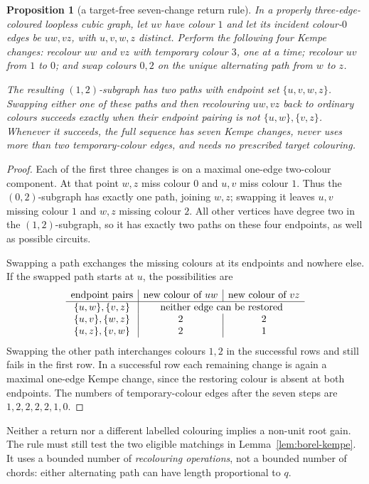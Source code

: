 \documentclass[11pt,a4paper]{article}
\newtheorem{proposition}[theorem]{Proposition}
\theoremstyle{definition}
\theoremstyle{remark}
\begin{document}
\begin{proposition}[a target-free seven-change return rule]\label{prop:two-buffer}
In a properly three-edge-coloured loopless cubic graph, let $uv$ have colour $1$ and let its incident colour-$0$ edges be $uw,vz$, with $u,v,w,z$ distinct.  Perform the following four Kempe changes: recolour $uw$ and $vz$ with temporary colour $3$, one at a time; recolour $uv$ from $1$ to $0$; and swap colours $0,2$ on the unique alternating path from $w$ to $z$.

The resulting $(1,2)$-subgraph has two paths with endpoint set $\{u,v,w,z\}$.  Swapping either one of these paths and then recolouring $uw,vz$ back to ordinary colours succeeds exactly when their endpoint pairing is not $\{u,w\},\{v,z\}$.  Whenever it succeeds, the full sequence has seven Kempe changes, never uses more than two temporary-colour edges, and needs no prescribed target colouring.
\end{proposition}
\begin{proof}
Each of the first three changes is on a maximal one-edge two-colour component.  At that point $w,z$ miss colour $0$ and $u,v$ miss colour $1$.  Thus the $(0,2)$-subgraph has exactly one path, joining $w,z$; swapping it leaves $u,v$ missing colour $1$ and $w,z$ missing colour $2$.  All other vertices have degree two in the $(1,2)$-subgraph, so it has exactly two paths on these four endpoints, as well as possible circuits.

Swapping a path exchanges the missing colours at its endpoints and nowhere else.  If the swapped path starts at $u$, the possibilities are
\[
\begin{array}{c|c|c}
\text{endpoint pairs}&\text{new colour of }uw&\text{new colour of }vz\\
\hline
\{u,w\},\{v,z\}&\multicolumn{2}{c}{\text{neither edge can be restored}}\\
\{u,v\},\{w,z\}&2&2\\
\{u,z\},\{v,w\}&2&1
\end{array}
\]
Swapping the other path interchanges colours $1,2$ in the successful rows and still fails in the first row.  In a successful row each remaining change is again a maximal one-edge Kempe change, since the restoring colour is absent at both endpoints.  The numbers of temporary-colour edges after the seven steps are $1,2,2,2,2,1,0$.
\end{proof}

Neither a return nor a different labelled colouring implies a non-unit root gain.  The rule must still test the two eligible matchings in Lemma~\ref{lem:borel-kempe}.  It uses a bounded number of \emph{recolouring operations}, not a bounded number of chords: either alternating path can have length proportional to $q$.
\end{document}
